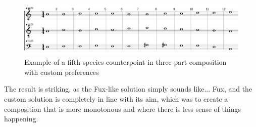 \begin{figure}[h]
    \centering
    \includegraphics[width=1\textwidth]{Images/Musicality/musicality-1sp-custom-pref.png}
    \caption{Example of a fifth species counterpoint in three-part composition with custom preferences}
    \label{fig:musicality-1sp-custom}
\end{figure}

The result is striking, as the Fux-like solution simply sounds like... Fux, and the custom solution is completely in line with its aim, which was to create a composition that is more monotonous and where there is less sense of things happening.